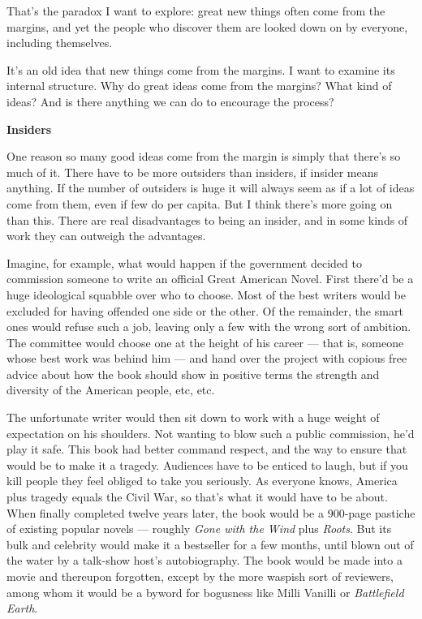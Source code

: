 \documentclass[12pt]{book}
\begin{document}
That's the paradox I want to explore: great new things often come from
the margins, and yet the people who discover them are looked down on by
everyone, including themselves.

It's an old idea that new things come from the margins. I want to
examine its internal structure. Why do great ideas come from the
margins? What kind of ideas? And is there anything we can do to
encourage the process?

\textbf{Insiders}

One reason so many good ideas come from the margin is simply that
there's so much of it. There have to be more outsiders than insiders, if
insider means anything. If the number of outsiders is huge it will
always seem as if a lot of ideas come from them, even if few do per
capita. But I think there's more going on than this. There are real
disadvantages to being an insider, and in some kinds of work they can
outweigh the advantages.

Imagine, for example, what would happen if the government decided to
commission someone to write an official Great American Novel. First
there'd be a huge ideological squabble over who to choose. Most of the
best writers would be excluded for having offended one side or the
other. Of the remainder, the smart ones would refuse such a job, leaving
only a few with the wrong sort of ambition. The committee would choose
one at the height of his career --- that is, someone whose best work was
behind him --- and hand over the project with copious free advice about
how the book should show in positive terms the strength and diversity of
the American people, etc, etc.

The unfortunate writer would then sit down to work with a huge weight of
expectation on his shoulders. Not wanting to blow such a public
commission, he'd play it safe. This book had better command respect, and
the way to ensure that would be to make it a tragedy. Audiences have to
be enticed to laugh, but if you kill people they feel obliged to take
you seriously. As everyone knows, America plus tragedy equals the Civil
War, so that's what it would have to be about. When finally completed
twelve years later, the book would be a 900-page pastiche of existing
popular novels --- roughly \emph{Gone with the Wind} plus \emph{Roots}.
But its bulk and celebrity would make it a bestseller for a few months,
until blown out of the water by a talk-show host's autobiography. The
book would be made into a movie and thereupon forgotten, except by the
more waspish sort of reviewers, among whom it would be a byword for
bogusness like Milli Vanilli or \emph{Battlefield Earth}.
\end{document}

